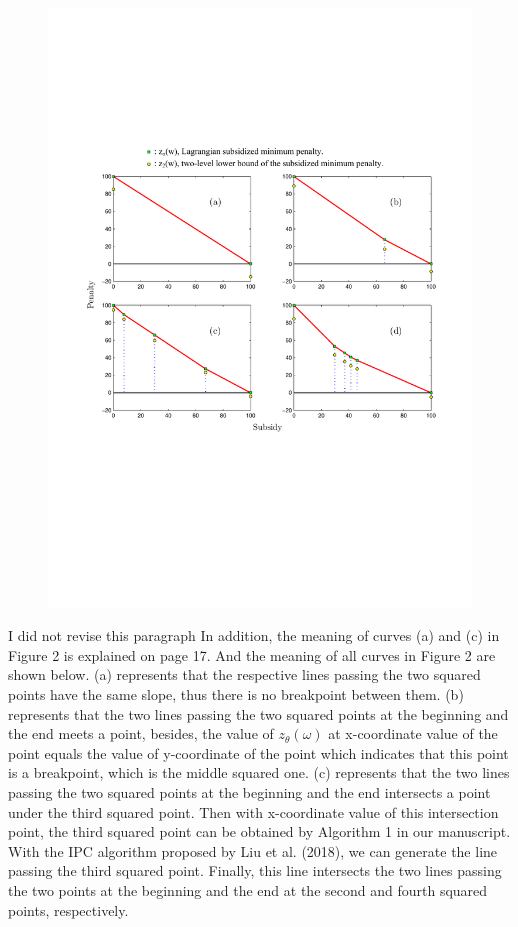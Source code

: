 \documentclass[11pt]{article}
\begin{document}
\begin{figure}[H]
\centering
\includegraphics[width=1\textwidth]{1.pdf}
\centering
\end{figure}
I did not revise this paragraph
In addition, the meaning of curves (a) and (c) in Figure 2 is explained on page 17.
And the meaning of all curves in Figure 2 are shown below. (a) represents that the respective lines passing the two squared points have the same slope, thus there is no breakpoint between them.
(b) represents that the two lines passing the two squared points at the beginning and the end meets a point, besides, the value of $z_\theta(\omega)$ at x-coordinate value of the point equals the value of y-coordinate of the point which indicates that this point is a breakpoint, which is the middle squared one. (c) represents that the two lines passing the two squared points at the beginning and the end intersects a point under the third squared point. Then with x-coordinate value of this intersection point, the third squared point can be obtained by Algorithm 1 in our manuscript. With the IPC algorithm proposed by Liu et al. (2018), we can generate the line passing the third squared point. Finally, this line intersects the two lines passing the two points at the beginning and the end at the second and fourth squared points, respectively.
\end{document}
